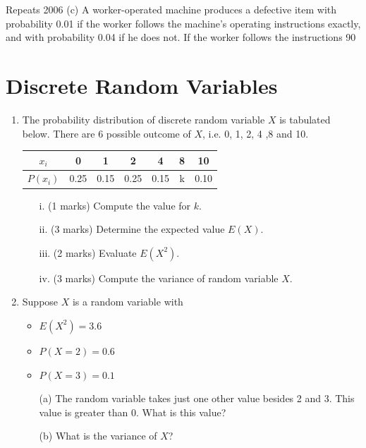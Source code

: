 \documentclass[12pt]{report}
\begin{document}
		Repeats 2006
		(c)              A worker-operated machine produces a defective item with probability 0.01 if the worker follows the machine’s operating instructions exactly, and with probability 0.04 if he does not. If the worker follows the instructions 90%
		
		
		
\section{Discrete Random Variables}
\begin{enumerate}
	\item  The probability distribution of discrete random variable $X$ is tabulated below. There are 6 possible outcome of $X$, i.e. 0, 1, 2, 4 ,8 and 10.
	\begin{center}
		\begin{tabular}{|c||c|c|c|c|c|c|}
			\hline
			$x_i$  & 0 & 1 & 2 & 4 & 8 & 10 \\\hline
			$P(x_i)$ & 0.25 & 0.15 & 0.25 & 0.15 & k & 0.10\\
			\hline
		\end{tabular}
	\end{center}
	
	\begin{itemize}
		\item[i.] (1 marks) Compute the value for $k$.
		\item[ii.] (3 marks) Determine the expected value $E(X)$.
		\item[iii.] (2 marks) Evaluate $E(X^2)$.
		\item[iv.] (3 marks) Compute the variance of random variable $X$.
	\end{itemize}
	\item 
	Suppose $X$ is a random variable with 
	\begin{itemize}
		\item $E(X^2)=3.6$
		\item $P(X=2)=0.6$
		\item $P(X=3)=0.1$
	\end{itemize}
	
	\begin{itemize}
		\item[(a)] The random variable takes just one other value besides 2 and 3. This value is greater than 0. What is this value?
		\item[(b)] What is the variance of $X$?
	\end{itemize}
	

\end{enumerate}
\end{document}
